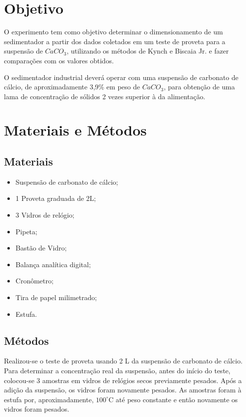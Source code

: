 \chapter{Objetivo}


O experimento tem como objetivo determinar o dimensionamento de um sedimentador a partir dos dados coletados em um teste de proveta para a suspensão de $ CaCO_{3} $, utilizando os métodos de Kynch e Biscaia Jr. e fazer comparações com os valores obtidos.

O sedimentador industrial deverá operar com uma suspensão de carbonato de cálcio, de aproximadamente 3,9\% em peso de $ CaCO_{3} $, para obtenção de uma lama de concentração de sólidos 2 vezes superior à da alimentação.
\\


\chapter{Materiais e Métodos}

\section{Materiais}

\begin{itemize}
\item Suspensão de carbonato de cálcio;
\item 1 Proveta graduada de 2L;
\item 3 Vidros de relógio;
\item Pipeta;
\item Bastão de Vidro;
\item Balança analítica digital;
\item Cronômetro;
\item Tira de papel milimetrado;
\item Estufa.
\end{itemize}

\section{Métodos}

Realizou-se o teste de proveta usando 2 L da suspensão de carbonato de cálcio. Para determinar a concentração real da suspensão, antes do início do teste, colocou-se 3 amostras em vidros de relógios secos previamente pesados. Após a adição da suspensão, os vidros foram novamente pesados. As amostras foram à estufa por, aproximadamente, $ 100^{\circ} $C até peso constante e então novamente os vidros foram pesados.



